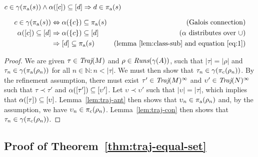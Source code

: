 \begin{lemma} \label{lem:traj-ant}
$c \in \gamma(\operatorname{\pi_{\textrm{a}}}(s)) \wedge \alpha([c]) \subseteq [d] \Rightarrow d \in \operatorname{\pi_{\textrm{a}}}(s)$
\end{lemma}%
%
\begin{align}
c \in \gamma(\operatorname{\pi_{\textrm{a}}}(s))      & \Leftrightarrow     \alpha(\{ c \}) \subseteq \operatorname{\pi_{\textrm{a}}}(s) \label{eq:1} & (\textrm{Galois connection}) \\
\alpha([c]) \subseteq [d] & \Rightarrow \alpha(\{ c \}) \subseteq [d]        \nonumber    & (\alpha \textrm{ distributes over } \cup) \\
                                  & \Rightarrow [d] \subseteq \operatorname{\pi_{\textrm{a}}}(s)         \nonumber    & (\textrm{lemma~\ref{lem:class-sub} and equation } \ref{eq:1})
\end{align}


\begin{proof}
We are given $\tau \in \operatorname{\textit{Traj}}(M)$ and $\rho \in \operatorname{\textit{Runs}}(\gamma(A))$, such that $| \tau | = | \rho |$ and $\tau_{n} \in \gamma(\operatorname{\pi_{\textrm{a}}}(\rho_{n}))$ for all $n \in \mathbb{N} : n < | \tau |$. We must then show that $\tau_{n} \in \gamma(\operatorname{\pi_{\textrm{c}}}(\rho_{n}))$. By the refinement assumption, there must exist $\tau' \in \operatorname{\textit{Traj}}(M)^{\infty}$ and $\upsilon' \in \operatorname{\textit{Traj}}(N)^{\infty}$ such that $\tau \prec \tau'$ and $\alpha([\tau']) \subseteq [\upsilon']$. Let $\upsilon \prec \upsilon'$ such that $| \upsilon | = | \tau |$, which implies that $\alpha([\tau]) \subseteq [\upsilon]$. Lemma~\ref{lem:traj-ant} then shows that $\upsilon_{n} \in \operatorname{\pi_{\textrm{a}}}(\rho_{n})$ and, by the assumption, we have $\upsilon_{n} \in \operatorname{\pi_{\textrm{c}}}(\rho_{n})$. Lemma~\ref{lem:traj-con} then shows that $\tau_{n} \in \gamma(\operatorname{\pi_{\textrm{c}}}(\rho_{n}))$.
\end{proof}

\subsection{Proof of Theorem~\ref{thm:traj-equal-set}}

